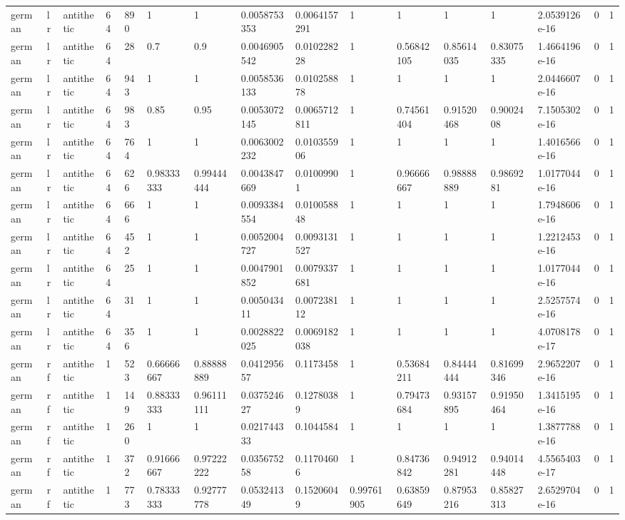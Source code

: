 \begin{tabular}{llllllllllllllll}
german & lr & antithetic & 64 & 890 & 1 & 1 & 0.0058753353 & 0.0064157291 & 1 & 1 & 1 & 1 & 2.0539126e-16 & 0 & 1 \\
german & lr & antithetic & 64 & 28 & 0.7 & 0.9 & 0.0046905542 & 0.010228228 & 1 & 0.56842105 & 0.85614035 & 0.83075335 & 1.4664196e-16 & 0 & 1 \\
german & lr & antithetic & 64 & 943 & 1 & 1 & 0.0058536133 & 0.010258878 & 1 & 1 & 1 & 1 & 2.0446607e-16 & 0 & 1 \\
german & lr & antithetic & 64 & 983 & 0.85 & 0.95 & 0.0053072145 & 0.0065712811 & 1 & 0.74561404 & 0.91520468 & 0.9002408 & 7.1505302e-16 & 0 & 1 \\
german & lr & antithetic & 64 & 764 & 1 & 1 & 0.0063002232 & 0.010355906 & 1 & 1 & 1 & 1 & 1.4016566e-16 & 0 & 1 \\
german & lr & antithetic & 64 & 626 & 0.98333333 & 0.99444444 & 0.0043847669 & 0.01009901 & 1 & 0.96666667 & 0.98888889 & 0.9869281 & 1.0177044e-16 & 0 & 1 \\
german & lr & antithetic & 64 & 666 & 1 & 1 & 0.0093384554 & 0.010058848 & 1 & 1 & 1 & 1 & 1.7948606e-16 & 0 & 1 \\
german & lr & antithetic & 64 & 452 & 1 & 1 & 0.0052004727 & 0.0093131527 & 1 & 1 & 1 & 1 & 1.2212453e-16 & 0 & 1 \\
german & lr & antithetic & 64 & 25 & 1 & 1 & 0.0047901852 & 0.0079337681 & 1 & 1 & 1 & 1 & 1.0177044e-16 & 0 & 1 \\
german & lr & antithetic & 64 & 31 & 1 & 1 & 0.005043411 & 0.007238112 & 1 & 1 & 1 & 1 & 2.5257574e-16 & 0 & 1 \\
german & lr & antithetic & 64 & 356 & 1 & 1 & 0.0028822025 & 0.0069182038 & 1 & 1 & 1 & 1 & 4.0708178e-17 & 0 & 1 \\
german & rf & antithetic & 1 & 523 & 0.66666667 & 0.88888889 & 0.041295657 & 0.1173458 & 1 & 0.53684211 & 0.84444444 & 0.81699346 & 2.9652207e-16 & 0 & 1 \\
german & rf & antithetic & 1 & 149 & 0.88333333 & 0.96111111 & 0.037524627 & 0.12780389 & 1 & 0.79473684 & 0.93157895 & 0.91950464 & 1.3415195e-16 & 0 & 1 \\
german & rf & antithetic & 1 & 260 & 1 & 1 & 0.021744333 & 0.1044584 & 1 & 1 & 1 & 1 & 1.3877788e-16 & 0 & 1 \\
german & rf & antithetic & 1 & 372 & 0.91666667 & 0.97222222 & 0.035675258 & 0.11704606 & 1 & 0.84736842 & 0.94912281 & 0.94014448 & 4.5565403e-17 & 0 & 1 \\
german & rf & antithetic & 1 & 773 & 0.78333333 & 0.92777778 & 0.053241349 & 0.15206049 & 0.99761905 & 0.63859649 & 0.87953216 & 0.85827313 & 2.6529704e-16 & 0 & 1 \\

\end{tabular}
